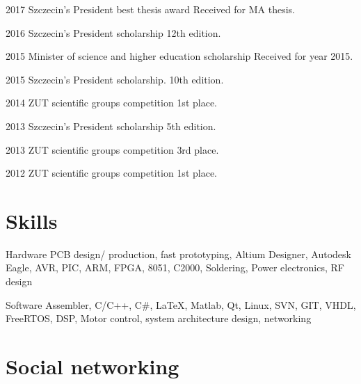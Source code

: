 \documentclass{tccv}
\begin{document}
\begin{yearlist}

\item{2017}
     {Szczecin's President best thesis award}
     {Received for MA thesis.} 

\item{2016}
     {Szczecin's President scholarship}
     {12th edition.} 
     
\item{2015}
     {Minister of science and higher education scholarship}
     {Received for year 2015.} 

\item{2015}
     {Szczecin's President scholarship.}
     {10th edition.} 

\item{2014}
     {ZUT scientific groups competition}
     {1st place.}
     
\item{2013}
     {Szczecin's President scholarship}
     {5th edition.} 

\item{2013}
     {ZUT scientific groups competition}
     {3rd place.}

\item{2012}
     {ZUT scientific groups competition}
     {1st place.}
    
\end{yearlist}

\section{Skills}

\begin{factlist}

\item{Hardware}
     {PCB design/ production, fast prototyping, Altium Designer, Autodesk Eagle, AVR, PIC, ARM, FPGA, 8051, C2000, Soldering, Power electronics, RF design}

\item{Software}
     {Assembler, C/C++, C\#, \LaTeX, Matlab, Qt, Linux, SVN, GIT, VHDL, FreeRTOS, DSP, Motor control, system architecture design, networking}

\end{factlist}

\section{Social networking}
\end{document}
